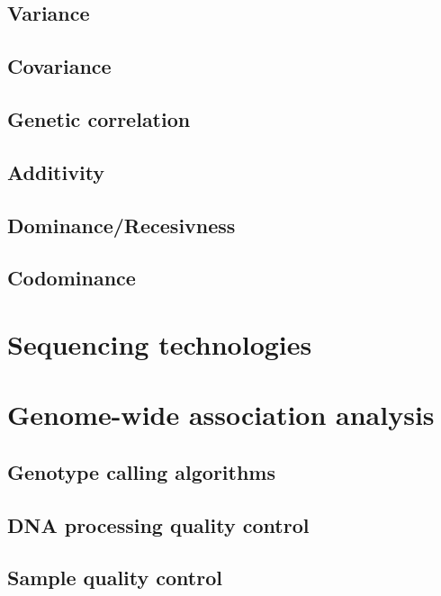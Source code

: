 \documentclass[]{book}
\theoremstyle{definition}
\theoremstyle{definition}
\theoremstyle{definition}
\theoremstyle{remark}
\begin{document}
\section{Variance}\label{variance}

\section{Covariance}\label{covariance}

\section{Genetic correlation}\label{genetic-correlation}

\section{Additivity}\label{additivity}

\section{Dominance/Recesivness}\label{dominancerecesivness}

\section{Codominance}\label{codominance}

\chapter{Sequencing technologies}\label{sequencing-technologies}

\chapter{Genome-wide association
analysis}\label{genome-wide-association-analysis}

\section{Genotype calling algorithms}\label{genotype-calling-algorithms}

\section{DNA processing quality
control}\label{dna-processing-quality-control}

\section{Sample quality control}\label{sample-quality-control}
\end{document}
